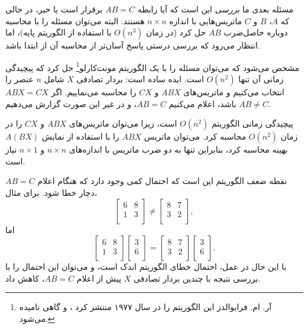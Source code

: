 مسئله بعدی ما \emph{بررسی} این است
که آیا رابطه $AB=C$ برقرار است یا خیر، در حالی که $A$، $B$ و $C$
ماتریس‌هایی با اندازه $n \times n$ هستند.
البته می‌توان مسئله را با محاسبه دوباره
حاصل‌ضرب $AB$ حل کرد
(در زمان $O(n^3)$ با استفاده از الگوریتم پایه)،
اما انتظار می‌رود که بررسی درستی پاسخ
آسان‌تر از محاسبه آن از ابتدا باشد.

مشخص می‌شود که می‌توان مسئله را با
یک الگوریتم مونت‌کارلو\footnote{آر. ام. فرایوالدز این الگوریتم را در سال ۱۹۷۷ منتشر کرد \cite{fre77}، و گاهی
  نامیده می‌شود.} حل کرد که
پیچیدگی زمانی آن تنها $O(n^2)$ است.
ایده ساده است: بردار تصادفی $X$
شامل $n$ عنصر را انتخاب می‌کنیم و ماتریس‌های
$ABX$ و $CX$ را محاسبه می‌نماییم. اگر $ABX=CX$ باشد، اعلام می‌کنیم $AB=C$،
و در غیر این صورت گزارش می‌دهیم $AB \neq C$.

پیچیدگی زمانی الگوریتم
$O(n^2)$ است، زیرا می‌توان ماتریس‌های
$ABX$ و $CX$ را در زمان $O(n^2)$ محاسبه کرد.
می‌توان ماتریس $ABX$ را با استفاده از نمایش $A(BX)$ بهینه محاسبه کرد،
بنابراین تنها به دو ضرب ماتریس
با اندازه‌های $n \times n$ و $n \times 1$ نیاز است.

نقطه ضعف الگوریتم این است
که احتمال کمی وجود دارد که هنگام اعلام $AB=C$ دچار خطا شود.
برای مثال،
\[
 \begin{bmatrix}
  6 & 8 \\
  1 & 3 \\
 \end{bmatrix}
\neq
 \begin{bmatrix}
  8 & 7 \\
  3 & 2 \\
 \end{bmatrix},
\]
اما
\[
 \begin{bmatrix}
  6 & 8 \\
  1 & 3 \\
 \end{bmatrix}
 \begin{bmatrix}
  3 \\
  6 \\
 \end{bmatrix}
=
 \begin{bmatrix}
  8 & 7 \\
  3 & 2 \\
 \end{bmatrix}
 \begin{bmatrix}
  3 \\
  6 \\
 \end{bmatrix}.
\]
با این حال در عمل، احتمال خطای الگوریتم اندک است،
و می‌توان این احتمال را با بررسی نتیجه با چندین
بردار تصادفی $X$ پیش از اعلام $AB=C$، کاهش داد.


